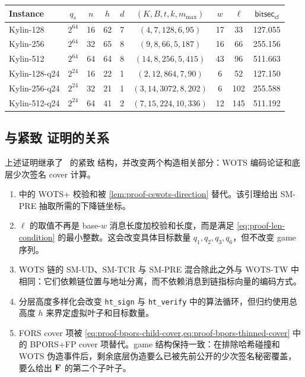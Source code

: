 \begin{center}
\begin{tabular}{lcccccccc}
\toprule
Instance & $q_s$ & $n$ & $h$ & $d$ & $(K,B,t,k,m_{\max})$ & $w$ & $\ell$ &
$\mathsf{bitsec}_{\mathsf{cl}}$ \\
\midrule
Kylin-128     & $2^{64}$ & 16 & 62 & 7  & $(4,7,128,6,95)$     & 17  & 33  & 127.055 \\
Kylin-256     & $2^{64}$ & 32 & 65 & 8  & $(9,8,66,5,187)$     & 16  & 66  & 255.156 \\
Kylin-512     & $2^{64}$ & 64 & 64 & 8  & $(14,8,256,5,415)$   & 43  & 96  & 511.663 \\
Kylin-128-q24 & $2^{24}$ & 16 & 22 & 1  & $(2,12,864,7,90)$    & 6   & 52  & 127.150 \\
Kylin-256-q24 & $2^{24}$ & 32 & 21 & 1  & $(3,14,3072,8,202)$  & 6   & 102 & 255.588 \\
Kylin-512-q24 & $2^{24}$ & 64 & 41 & 2  & $(7,15,224,10,336)$  & 12  & 145 & 511.192 \\
\bottomrule
\end{tabular}
\end{center}

\subsection{与紧致 \SPHINCSP 证明的关系}
\label{sec:proof-sphincs-comparison}

上述证明继承了~\cite{AC:HulKud22} 的紧致 \SPHINCSP 结构，并改变两个构造相关部分：WOTS 编码论证和底层少次签名 cover 计算。
\begin{enumerate}
    \item \SPHINCSP 中的 WOTS+ 校验和被 \cref{lem:proof-cswots-direction} 替代。该引理给出 SM-PRE 抽取所需的下降链坐标。
    \item $\ell$ 的取值不再是 base-$w$ 消息长度加校验和长度，而是满足 \cref{eq:proof-len-condition} 的最小整数。这会改变具体目标数量 $q_1,q_2,q_3,q_6$，但不改变 game 序列。
    \item WOTS 链的 SM-UD、SM-TCR 与 SM-PRE 混合除此之外与 WOTS-TW 中相同：它们依赖链位置与地址分离，而不依赖消息到链指标向量的编码方式。
    \item 分层高度多样化会改变 \texttt{ht\_sign} 与 \texttt{ht\_verify} 中的算法循环，但归约使用总高度 $h$ 来界定虚拟叶子和目标数量。
    \item FORS cover 项被 \cref{eq:proof-bpors-child-cover,eq:proof-bpors-thinned-cover} 中的 BPORS+FP cover 项替代。game 结构保持一致：在排除哈希碰撞和 WOTS 伪造事件后，剩余底层伪造要么已被先前公开的少次签名秘密覆盖，要么给出 $\mathbf{F}$ 的第二个子叶子。
\end{enumerate}

